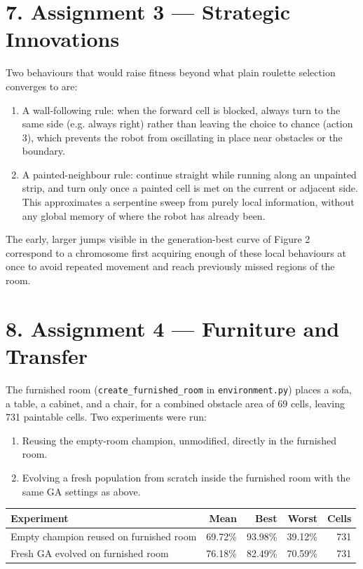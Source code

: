 \documentclass[12pt,a4paper]{article}
\begin{document}
\section*{7. Assignment 3 --- Strategic Innovations}

Two behaviours that would raise fitness beyond what plain roulette selection converges to are:

\begin{enumerate}[leftmargin=1.6em]
  \item A wall-following rule: when the forward cell is blocked, always turn to the same side (e.g. always right) rather than leaving the choice to chance (action 3), which prevents the robot from oscillating in place near obstacles or the boundary.
  \item A painted-neighbour rule: continue straight while running along an unpainted strip, and turn only once a painted cell is met on the current or adjacent side. This approximates a serpentine sweep from purely local information, without any global memory of where the robot has already been.
\end{enumerate}

The early, larger jumps visible in the generation-best curve of Figure 2 correspond to a chromosome first acquiring enough of these local behaviours at once to avoid repeated movement and reach previously missed regions of the room.

\section*{8. Assignment 4 --- Furniture and Transfer}

The furnished room (\texttt{create\_furnished\_room} in \texttt{environment.py}) places a sofa, a table, a cabinet, and a chair, for a combined obstacle area of 69 cells, leaving 731 paintable cells. Two experiments were run:

\begin{enumerate}[leftmargin=1.6em]
  \item Reusing the empty-room champion, unmodified, directly in the furnished room.
  \item Evolving a fresh population from scratch inside the furnished room with the same GA settings as above.
\end{enumerate}

\begin{center}
\small
\begin{tabular}{@{}lrrrr@{}}
\toprule
\textbf{Experiment} & \textbf{Mean} & \textbf{Best} & \textbf{Worst} & \textbf{Cells} \\
\midrule
Empty champion reused on furnished room & 69.72\% & 93.98\% & 39.12\% & 731 \\
Fresh GA evolved on furnished room & 76.18\% & 82.49\% & 70.59\% & 731 \\
\bottomrule
\end{tabular}
\end{center}
\end{document}
